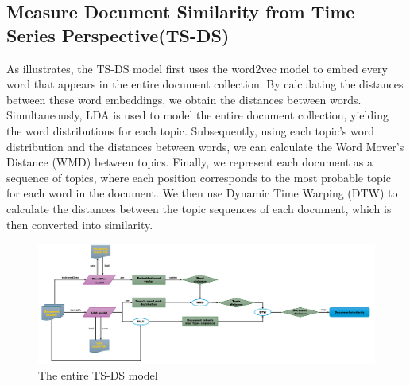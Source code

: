 \documentclass[UTF8]{ctexart}
\begin{document}
\subsection{Measure Document Similarity from Time Series Perspective(TS-DS)}
{
    As  illustrates,
    the TS-DS model first uses the word2vec model to embed every word that appears in the entire document collection.
    By calculating the distances between these word embeddings, we obtain the distances between words. Simultaneously,
    LDA is used to model the entire document collection, yielding the word distributions for each topic.
    Subsequently, using each topic's word distribution and the distances between words,
    we can calculate the Word Mover's Distance (WMD) between topics.
    Finally, we represent each document as a sequence of topics,
    where each position corresponds to the most probable topic for each word in the document.
    We then use Dynamic Time Warping (DTW) to calculate the distances between the topic sequences of each document,
    which is then converted into similarity.

    \begin{figure}[htbp]
        \captionsetup{position=bottom, skip=8pt}
        \centering
        \includegraphics[width=1\textwidth]{TS_DS}
        \caption{The entire TS-DS model}
        \label{fig:TS_DS}
    \end{figure}
}
\end{document}
